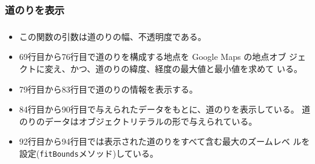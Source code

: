 \begin{frame}[containsverbatim]
 \frametitle{道のりを表示}
\end{frame}
\begin{frame}[containsverbatim]
 \frametitle{}
\begin{itemize}
	\item この関数の引数は道のりの幅、不透明度である。
	\item 69行目から76行目で道のりを構成する地点を Google Maps の地点オブ
				ジェクトに変え、かつ、道のりの緯度、経度の最大値と最小値を求めて
				いる。
	\item 79行目から83行目で道のりの情報を表示する。
	\item 84行目から90行目で与えられたデータをもとに、道のりを表示している。
				道のりのデータはオブジェクトリテラルの形で与えられている。
	\item 92行目から94行目では表示された道のりをすべて含む最大のズームレベ
				ルを設定(\texttt{fitBounds}メソッド)している。
 \end{itemize}
\end{frame}
